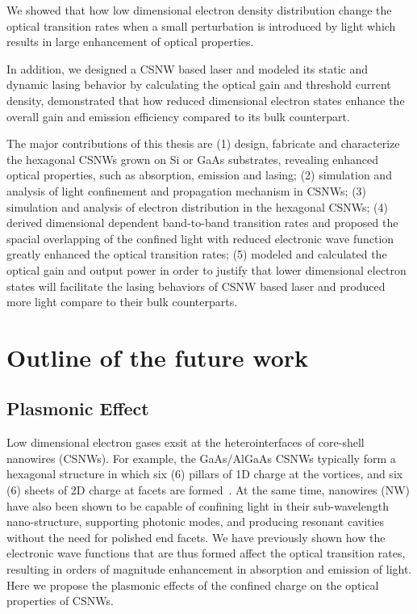 We showed that how low dimensional electron density distribution change the optical transition rates when a small perturbation is introduced by light
which results in large enhancement of optical properties.

In addition, we designed a CSNW based laser and modeled its static and dynamic
lasing behavior by calculating the optical gain and threshold current density,
demonstrated that how reduced dimensional electron states enhance the overall
gain and emission efficiency compared to its bulk counterpart.

The major contributions of this thesis are (1) design, fabricate and
characterize the hexagonal CSNWs grown on Si or GaAs substrates, revealing enhanced 
optical properties, such as absorption, emission and lasing; (2)
simulation and analysis of light confinement and propagation mechanism in
CSNWs; (3) simulation and analysis of electron distribution in the hexagonal
CSNWs; (4) derived dimensional dependent band-to-band transition rates and
proposed the spacial overlapping of the confined light with reduced electronic
wave function greatly enhanced the optical transition rates; (5) modeled and
calculated the optical gain and output power in order to justify that lower
dimensional electron states will facilitate the lasing behaviors of CSNW based
laser and produced more light compare to their bulk counterparts.

\section{Outline of the future work}


\subsection{Plasmonic Effect}

Low dimensional electron gases exsit at the heterointerfaces of core-shell
nanowires (CSNWs). For example, the GaAs/AlGaAs CSNWs typically form a
hexagonal structure in which six (6) pillars of 1D charge at the vortices, and
six (6) sheets of 2D charge at facets  are formed~\cite{Wang:2015hz}. At the same time,
nanowires (NW) have also been shown to be capable of confining light in their
sub-wavelength nano-structure, supporting photonic modes, and producing
resonant cavities without the need for polished end facets. We have previously
shown how the electronic wave functions that are thus formed affect the optical
transition rates, resulting in orders of magnitude  enhancement in absorption
and emission of light. Here we propose the plasmonic effects of the
confined charge on the optical properties of CSNWs.

